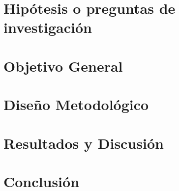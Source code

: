 \documentclass[12pt]{article}
\begin{document}
% 

\section{Hipótesis o preguntas de investigación}\label{sec:hipotesis}

% 

\section{Objetivo General}\label{sec:objetivos}

% 

\section{Diseño Metodológico}\label{metodologia}

% 

\section{Resultados y Discusión}\label{resultados_discusion}

% 

\section{Conclusión}\label{conclusion}

% 



\end{document}
